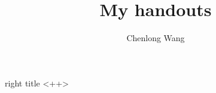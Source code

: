 \documentclass[12pt]{cwphandout}
\begin{document}
\author{Chenlong Wang}
\title{My handouts}{right title}
<++>
\end{document}
